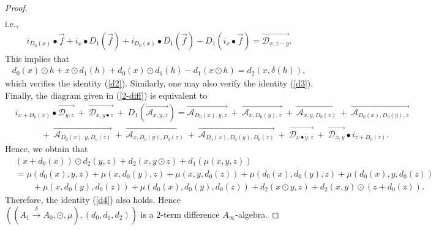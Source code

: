 \documentclass[a4paper,reqno,10pt]{amsart}
\theoremstyle{plain}
\theoremstyle{definition}
\theoremstyle{remark}
\begin{document}
\begin{proof}
\begin{align*}
\end{align*}
i.e.,
\begin{align*}
    i_{D_0 (x)} \bullet \overrightarrow{f} + i_x \bullet D_1 ( \overrightarrow{f} ) + i_{D_0 (x)} \bullet D_1 ( \overrightarrow{f} ) - D_1 (i_x \bullet \overrightarrow{f}) = \overrightarrow{ \mathcal{D}_{x, z-y}}.
\end{align*}
This implies that
\begin{align*}
    d_0 (x) \odot h + x \odot d_1 (h) + d_0 (x) \odot d_1 (h) - d_1 (x \odot h) = d_2 (x, \delta (h)),
\end{align*}
which verifies the identity (\ref{d2}). Similarly, one may also verify the identity (\ref{d3}). Finally, the diagram given in (\ref{2-diff}) is equivalent to
\begin{align*}
    &i_{x+ D_0 (x)} \bullet \overrightarrow{ \mathcal{D}_{y, z}} ~+~ \overrightarrow{ \mathcal{D}_{x, y \bullet z}} ~+~ D_1 (\overrightarrow{ \mathcal{A}_{x, y, z} }) = \overrightarrow{ \mathcal{A}_{D_0 (x), y, z} } ~+~ \overrightarrow{ \mathcal{A}_{x, D_0 (y), z} } ~+~ \overrightarrow{ \mathcal{A}_{x, y, D_0 (z) }} ~+~ \overrightarrow{ \mathcal{A}_{D_0 (x), D_0 (y), z} } \\
    & \qquad \quad +~ \overrightarrow{ \mathcal{A}_{D_0 (x), y, D_0 (z)}} ~+~ \overrightarrow{ \mathcal{A}_{x, D_0 (y), D_0 (z)}} ~+~ \overrightarrow{ \mathcal{A}_{D_0 (x), D_0 (y), D_0 (z)}} ~+~ \overrightarrow{ \mathcal{D}_{x \bullet y , z}} ~+~ \overrightarrow{ \mathcal{D}_{x, y}} \bullet i_{z + D_0 (z)}.
\end{align*}
Hence, we obtain that
\begin{align*}
     &(x + d_0 (x)) \odot d_2 (y, z)  + d_2 (x, y \odot z) + d_1 (\mu (x, y, z) ) \nonumber \\
        &= \mu (d_0 (x), y, z) + \mu (x, d_0 (y), z) + \mu (x,y, d_0 (z)) + \mu (d_0 (x), d_0 (y), z) + \mu ( d_0 (x), y, d_0 (z)) \nonumber \\ 
        & \qquad + \mu (x, d_0 (y), d_0 (z)) 
        + \mu (d_0 (x), d_0 (y), d_0 (z)) + d_2 (x \odot y, z) + d_2 (x, y) \odot (z + d_0 (z)) .
\end{align*}
Therefore, the identity (\ref{d4}) also holds. Hence $((A_1 \xrightarrow{\delta} A_0, \odot, \mu ), (d_0, d_1, d_2) )$ is a $2$-term difference $A_\infty$-algebra.

\medskip


\end{proof}
\end{document}
